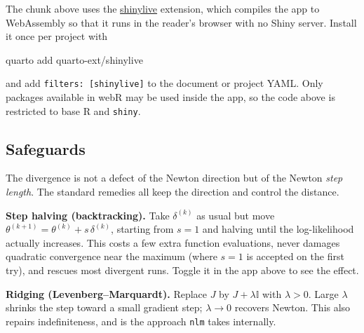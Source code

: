 \documentclass[
  letterpaper,
  DIV=11,
  numbers=noendperiod]{scrreprt}
\newenvironment{Shaded}{\begin{snugshade}}{\end{snugshade}}
\newcommand{\ExtensionTok}[1]{\textcolor[rgb]{0.00,0.23,0.31}{#1}}
\newcommand{\NormalTok}[1]{\textcolor[rgb]{0.00,0.23,0.31}{#1}}
\begin{document}
\begin{tcolorbox}[enhanced jigsaw, arc=.35mm, bottomrule=.15mm, bottomtitle=1mm, breakable, colback=white, colbacktitle=quarto-callout-note-color!10!white, colframe=quarto-callout-note-color-frame, coltitle=black, left=2mm, leftrule=.75mm, opacityback=0, opacitybacktitle=0.6, rightrule=.15mm, title=\textcolor{quarto-callout-note-color}{\faInfo}\hspace{0.5em}{Reproducing this figure}, titlerule=0mm, toprule=.15mm, toptitle=1mm]

The chunk above uses the
\href{https://github.com/quarto-ext/shinylive}{shinylive} extension,
which compiles the app to WebAssembly so that it runs in the reader's
browser with no Shiny server. Install it once per project with

\begin{Shaded}
\begin{Highlighting}[]
\ExtensionTok{quarto}\NormalTok{ add quarto{-}ext/shinylive}
\end{Highlighting}
\end{Shaded}

and add \texttt{filters:\ {[}shinylive{]}} to the document or project
YAML. Only packages available in webR may be used inside the app, so the
code above is restricted to base R and \texttt{shiny}.

\end{tcolorbox}

\subsection{Safeguards}\label{safeguards-1}

The divergence is not a defect of the Newton direction but of the Newton
\emph{step length}. The standard remedies all keep the direction and
control the distance.

\textbf{Step halving (backtracking).} Take \(\delta^{(k)}\) as usual but
move \(\theta^{(k+1)} = \theta^{(k)} + s\,\delta^{(k)}\), starting from
\(s = 1\) and halving until the log-likelihood actually increases. This
costs a few extra function evaluations, never damages quadratic
convergence near the maximum (where \(s = 1\) is accepted on the first
try), and rescues most divergent runs. Toggle it in the app above to see
the effect.

\textbf{Ridging (Levenberg--Marquardt).} Replace \(J\) by
\(J + \lambda \mathbb{I}\) with \(\lambda > 0\). Large \(\lambda\)
shrinks the step toward a small gradient step; \(\lambda \to 0\)
recovers Newton. This also repairs indefiniteness, and is the approach
\texttt{nlm} takes internally.
\end{document}
